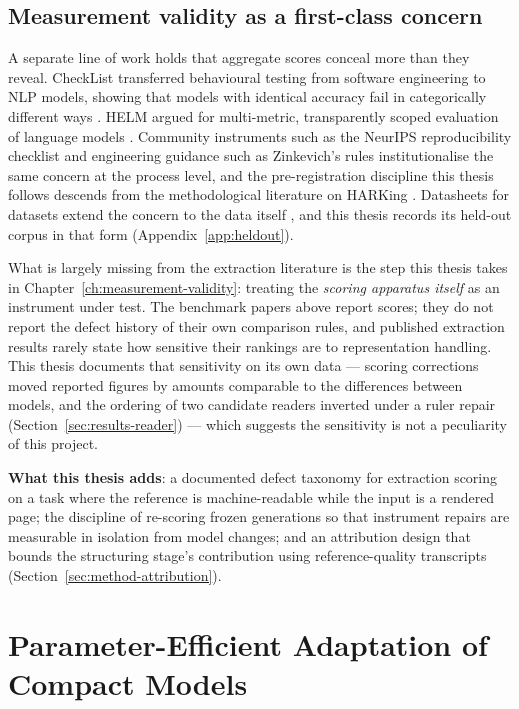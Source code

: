 \subsection{Measurement validity as a first-class concern}

A separate line of work holds that aggregate scores conceal more than they reveal.
CheckList transferred behavioural testing from software engineering to \ac{NLP} models,
showing that models with identical accuracy fail in categorically different ways
\parencite{ribeiro2020checklist}. \ac{HELM} argued for multi-metric, transparently scoped
evaluation of language models \parencite{liang2022helm}. Community instruments such as the
NeurIPS reproducibility checklist \parencite{neuripschecklist} and engineering guidance such as
Zinkevich's rules \parencite{zinkevich2018rules} institutionalise the same concern at the
process level, and the pre-registration discipline this thesis follows descends from the
methodological literature on \ac{HARKing} \parencite{kerr1998}. Datasheets for datasets extend
the concern to the data itself \parencite{gebru2018datasheets}, and this thesis records its
held-out corpus in that form (Appendix~\ref{app:heldout}).

What is largely missing from the extraction literature is the step this thesis takes in
Chapter~\ref{ch:measurement-validity}: treating the \emph{scoring apparatus itself} as an
instrument under test. The benchmark papers above report scores; they do not report the
defect history of their own comparison rules, and published extraction results rarely
state how sensitive their rankings are to representation handling. This thesis documents
that sensitivity on its own data --- scoring corrections moved reported figures by amounts
comparable to the differences between models, and the ordering of two candidate readers
inverted under a ruler repair (Section~\ref{sec:results-reader}) --- which suggests the
sensitivity is not a peculiarity of this project.

\textbf{What this thesis adds}: a documented defect taxonomy for extraction scoring on a
task where the reference is machine-readable while the input is a rendered page; the
discipline of re-scoring frozen generations so that instrument repairs are measurable in
isolation from model changes; and an attribution design that bounds the structuring
stage's contribution using reference-quality transcripts
(Section~\ref{sec:method-attribution}).

\section{Parameter-Efficient Adaptation of Compact Models}
\label{sec:rw-adaptation}

